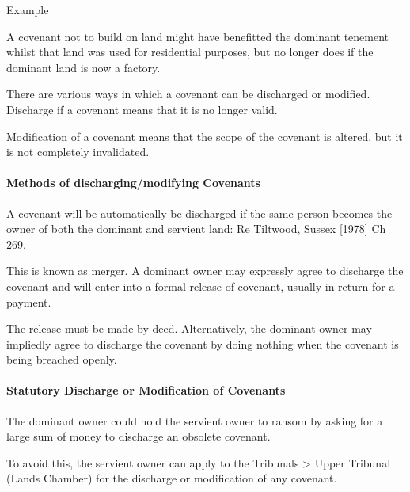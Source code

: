 \documentclass[
]{article}
\newenvironment{env-c75278ec-0f81-4db3-97b1-0452147ba646}
{
    \savenotes\tcolorbox[blanker,breakable,left=5pt,borderline west={2pt}{-4pt}{purple}]
}
{
    \endtcolorbox\spewnotes
}
\begin{document}
\begin{env-c75278ec-0f81-4db3-97b1-0452147ba646}

Example

A covenant not to build on land might have benefitted the dominant
tenement whilst that land was used for residential purposes, but no
longer does if the dominant land is now a factory.

\end{env-c75278ec-0f81-4db3-97b1-0452147ba646}

There are various ways in which a covenant can be discharged or
modified. Discharge if a covenant means that it is no longer valid.

Modification of a covenant means that the scope of the covenant is
altered, but it is not completely invalidated.

\hypertarget{methods-of-dischargingmodifying-covenants}{%
\paragraph{Methods of discharging/modifying
Covenants}\label{methods-of-dischargingmodifying-covenants}}

A covenant will be automatically be discharged if the same person
becomes the owner of both the dominant and servient land: Re Tiltwood,
Sussex {[}1978{]} Ch 269.

This is known as merger. A dominant owner may expressly agree to
discharge the covenant and will enter into a formal release of covenant,
usually in return for a payment.

The release must be made by deed. Alternatively, the dominant owner may
impliedly agree to discharge the covenant by doing nothing when the
covenant is being breached openly.

\hypertarget{statutory-discharge-or-modification-of-covenants}{%
\paragraph{Statutory Discharge or Modification of
Covenants}\label{statutory-discharge-or-modification-of-covenants}}

The dominant owner could hold the servient owner to ransom by asking for
a large sum of money to discharge an obsolete covenant.

To avoid this, the servient owner can apply to the Tribunals
\textgreater{} Upper Tribunal (Lands Chamber) for the discharge or
modification of any covenant.
\end{document}
